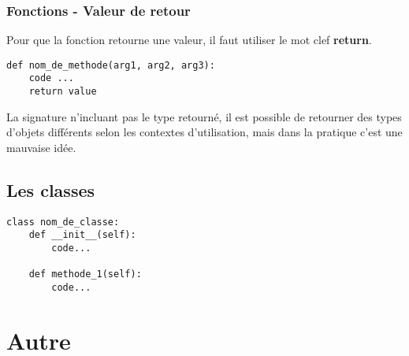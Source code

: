 \begin{frame}[fragile]
  \frametitle{Fonctions - Valeur de retour}
Pour que la fonction retourne une valeur, il faut utiliser le mot clef {\bf return}.
  \begin{lstlisting}
def nom_de_methode(arg1, arg2, arg3):
    code ...
    return value
  \end{lstlisting}

La signature n'incluant pas le type retourné, il est possible de retourner des types d'objets différents selon les contextes d'utilisation, mais dans la pratique c'est une mauvaise idée.
\end{frame}

\subsection{Les classes}
\begin{frame}[fragile]
  \begin{lstlisting}
class nom_de_classe:
    def __init__(self):
        code...

    def methode_1(self):
        code...
  \end{lstlisting}
\end{frame}

\section{Autre}
